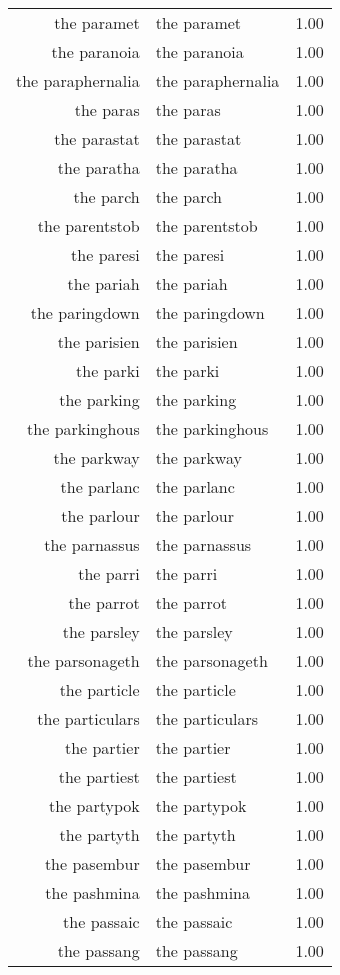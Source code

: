 \begin{table}[ht]
\begin{tabular}{rlr}
  the paramet & the paramet & 1.00 \\ 
  the paranoia & the paranoia & 1.00 \\ 
  the paraphernalia & the paraphernalia & 1.00 \\ 
  the paras & the paras & 1.00 \\ 
  the parastat & the parastat & 1.00 \\ 
  the paratha & the paratha & 1.00 \\ 
  the parch & the parch & 1.00 \\ 
  the parentstob & the parentstob & 1.00 \\ 
  the paresi & the paresi & 1.00 \\ 
  the pariah & the pariah & 1.00 \\ 
  the paringdown & the paringdown & 1.00 \\ 
  the parisien & the parisien & 1.00 \\ 
  the parki & the parki & 1.00 \\ 
  the parking & the parking & 1.00 \\ 
  the parkinghous & the parkinghous & 1.00 \\ 
  the parkway & the parkway & 1.00 \\ 
  the parlanc & the parlanc & 1.00 \\ 
  the parlour & the parlour & 1.00 \\ 
  the parnassus & the parnassus & 1.00 \\ 
  the parri & the parri & 1.00 \\ 
  the parrot & the parrot & 1.00 \\ 
  the parsley & the parsley & 1.00 \\ 
  the parsonageth & the parsonageth & 1.00 \\ 
  the particle & the particle & 1.00 \\ 
  the particulars & the particulars & 1.00 \\ 
  the partier & the partier & 1.00 \\ 
  the partiest & the partiest & 1.00 \\ 
  the partypok & the partypok & 1.00 \\ 
  the partyth & the partyth & 1.00 \\ 
  the pasembur & the pasembur & 1.00 \\ 
  the pashmina & the pashmina & 1.00 \\ 
  the passaic & the passaic & 1.00 \\ 
  the passang & the passang & 1.00 \\ 

\end{tabular}
\end{table}
